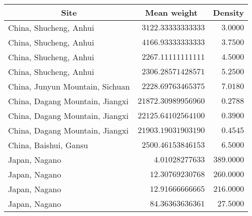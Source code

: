 \begin{tabular}{lrr} \toprule
\multicolumn{1}{c}{Site} & \multicolumn{1}{c}{Mean weight} & \multicolumn{1}{c}{Density} \\\midrule
China, Shucheng, Anhui          & $3122.33333333333$  & $3.0000$   \\
China, Shucheng, Anhui          & $4166.93333333333$  & $3.7500$   \\
China, Shucheng, Anhui          & $2267.11111111111$  & $4.5000$   \\
China, Shucheng, Anhui          & $2306.28571428571$  & $5.2500$   \\
China, Junyun Mountain, Sichuan & $2228.69763465375$  & $7.0180$   \\
China, Dagang Mountain, Jiangxi & $21872.30989956960$ & $0.2788$   \\
China, Dagang Mountain, Jiangxi & $22125.64102564100$ & $0.3900$   \\
China, Dagang Mountain, Jiangxi & $21903.19031903190$ & $0.4545$   \\
China, Baishui, Gansu           & $2500.46153846153$  & $6.5000$   \\
Japan, Nagano                   & $4.01028277633$     & $389.0000$ \\
Japan, Nagano                   & $12.30769230768$    & $260.0000$ \\
Japan, Nagano                   & $12.91666666665$    & $216.0000$ \\
Japan, Nagano                   & $84.36363636361$    & $27.5000$  \\\bottomrule
\end{tabular}
